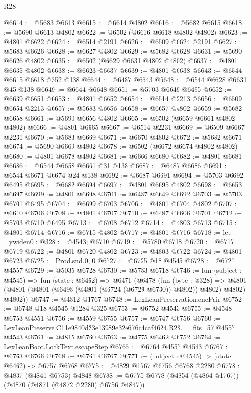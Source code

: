 \begin{lexlean}{R28}
\begin{coremodule}
@6614 := @5683 @6613
@6615 := @6614 @4802
@6616 := @5682 @6615
@6618 := @5690 @6613 @4802
@6622 := @6502 (@6616 @6618 @4802 @4802)
@6623 := @4801 @6622
@6624 := @6514 @2191
@6626 := @6509 @6624 @2191
@6627 := @5683 @6626
@6628 := @6627 @4802
@6629 := @5682 @6628
@6631 := @5690 @6626 @4802
@6635 := @6502 (@6629 @6631 @4802 @4802)
@6637 := @4801 @6635 @4802
@6638 := @6623 @6637
@6639 := @4801 @6638
@6643 := @6544 @6615 @6618 @352 @138
@6644 := @6487 @6643
@6648 := @6544 @6628 @6631 @45 @138
@6649 := @6644 @6648
@6651 := @5703 @6649 @6495
@6652 := @6639 @6651
@6653 := @4801 @6652
@6654 := @6514 @2213
@6656 := @6509 @6654 @2213
@6657 := @5683 @6656
@6658 := @6657 @4802
@6659 := @5682 @6658
@6661 := @5690 @6656 @4802
@6665 := @6502 (@6659 @6661 @4802 @4802)
@6666 := @4801 @6665
@6667 := @6514 @2231
@6669 := @6509 @6667 @2231
@6670 := @5683 @6669
@6671 := @6670 @4802
@6672 := @5682 @6671
@6674 := @5690 @6669 @4802
@6678 := @6502 (@6672 @6674 @4802 @4802)
@6680 := @4801 @6678 @4802
@6681 := @6666 @6680
@6682 := @4801 @6681
@6686 := @6544 @6658 @6661 @31 @138
@6687 := @6487 @6686
@6691 := @6544 @6671 @6674 @24 @138
@6692 := @6687 @6691
@6694 := @5703 @6692 @6495
@6695 := @6682 @6694
@6697 := @4801 @6695 @4802
@6698 := @6653 @6697
@6699 := @4801 @6698
@6701 := @6487 @6649 @6692
@6703 := @5703 @6701 @6495
@6704 := @6699 @6703
@6706 := @4801 @6704 @4802
@6707 := @6610 @6706
@6708 := @4801 @6707
@6710 := @6487 @6606 @6701
@6712 := @5703 @6710 @6495
@6713 := @6708 @6712
@6714 := @4803 @6713
@6715 := @4801 @6714
@6716 := @6715 @4802
@6717 := @4801 @6716
@6718 := let _ywiden0 : @328 := @4543; @6710
@6719 := @5780 @6718
@6720 := @6717 @6719
@6722 := @4801 @6720 @4802
@6723 := @4803 @6722
@6724 := @4801 @6723
@6725 := Prod.snd.{0, 0}
@6727 := @6725 @18 @4545
@6728 := @6727 @4557
@6729 := @5035 @6728
@6730 := @5783 @6718
@6746 := fun (subject : @4545) =>
  fun (state : @6462) =>
  @6471
    (@6478
      (fun (byte : @328) =>
      @4801 (@4801 (@4801 (@6498 (@4801 (@6724 (@6729 @6730)) @4802)) @4802) @4802) @4802))
@6747 := @4812 @1767
@6748 := LexLeanPreservation.encPair
@6752 := @6748 @18 @4545 @1284 @325
@6753 := @6752 @4543
@6755 := @4548 @6753 @4551
@6756 := @4559 @6755
@6757 := @6747 @6756
@6760 := LexLeanPreserve.C11e9840d23e13989e32e676c4caf4624.R28.__fits_57 @4557 @4543
@6761 := @4815 @6760
@6763 := @4775 @6462 @6752
@6764 := LexLeanBoot.LockText.escapeStep
@6766 := @6764 @4557 @4543
@6767 := @6763 @6766
@6768 := @6761 @6767
@6771 := (subject : @4545) -> (state : @6462) -> @6757 @6768
@6775 := @4829 @1767 @6756 @6768 @2280
@6778 := @4837 (@4841 @6753) @4848
@6788 := @6775 @6778 (@4854 (@4864 @1767)) (@4870 (@4871 (@4872 @2280) @6756 @4847))

\end{coremodule}
\end{lexlean}
